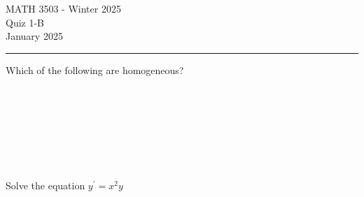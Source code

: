 \documentclass[12pt,letterpaper, onecolumn]{exam}
\begin{document}
\begingroup  
    \centering
    \LARGE MATH 3503 - Winter 2025\\
    \LARGE Quiz 1-B\\[0.5em]
    \large January 2025\\[0.5em]
\endgroup
\rule{\textwidth}{0.4pt}
\pointsdroppedatright   %
\printanswers
\renewcommand{\solutiontitle}{\noindent\textbf{Ans:}\enspace}   %

\begin{questions}

    \question[3 Marks] Which of the following are homogeneous?\droppoints
    
    \begin{solution}
            \\
            \\
            \\
            \\
            \\
            \\
    \end{solution}
    
    \question[3 Marks] Solve the equation $y^{'} = x^2y$ \droppoints
    
    \begin{solution}
    \\
    \\
    \\
    \\
    \\
    \\
    \\
    \\
    \\
    \\
    \\
    \\
    \\
    \\
    \\
    \end{solution}


\end{questions}
\end{document}
